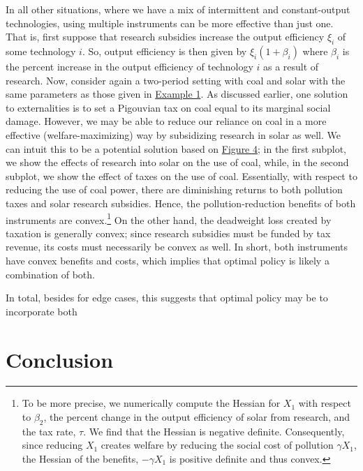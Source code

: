 \documentclass[11pt,a4paper]{extarticle}
\begin{document}
In all other situations, where we have a mix of intermittent and constant-output technologies, using multiple instruments can be more effective than just one. That is,  first suppose that research subsidies increase the output efficiency $\xi_i$ of some technology $i$. So, output efficiency is then given by $\xi_i \left( 1 + \beta_i \right)$ where $\beta_i$ is the percent increase in the output efficiency of technology $i$ as a result of research. Now, consider again a two-period setting with coal and solar with the same parameters as those given in \hyperref[Params: Example 1]{Example 1}. As discussed earlier, one solution to externalities is to set a Pigouvian tax on coal equal to its marginal social damage.  However, we may be able to reduce our reliance on coal in a more effective (welfare-maximizing) way by subsidizing research in solar as well. We can intuit this to be a potential solution based on \hyperref[fig:coaltech]{Figure 4}; in the first subplot, we show the effects of research into solar on the use of coal, while, in the second subplot, we show the effect of taxes on the use of coal. Essentially, with respect to reducing the use of coal power, there are diminishing returns to both pollution taxes and solar research subsidies. Hence, the pollution-reduction benefits of both instruments are convex.\footnote{To be more precise, we numerically compute the Hessian for $X_1$ with respect to $\beta_2$, the percent change in the output efficiency of solar from research, and the tax rate, $\tau$. We find that the Hessian is negative definite. Consequently, since reducing $X_1$ creates welfare by reducing the social cost of pollution $\gamma X_1$, the Hessian of the benefits, $-\gamma X_1$ is positive definite and thus convex.} On the other hand, the deadweight loss created by taxation is generally convex; since research subsidies must be funded by tax revenue, its costs must necessarily be convex as well. In short, both instruments have convex benefits and costs, which implies that optimal policy is likely a combination of both. 

In total, besides for edge cases, this suggests that optimal policy may be to incorporate both 







\pagebreak

\section{Conclusion}
\end{document}
